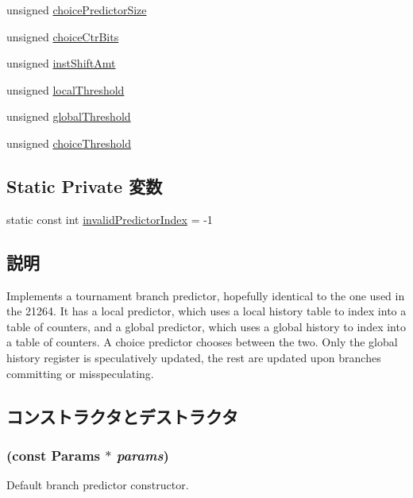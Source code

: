 \begin{DoxyCompactItemize}
\item 
unsigned \hyperlink{classTournamentBP_aa71f36048f2ff08f22872c928bb15ad7}{choicePredictorSize}
\item 
unsigned \hyperlink{classTournamentBP_aee44accc1717e338f8b33ff113d62be2}{choiceCtrBits}
\item 
unsigned \hyperlink{classTournamentBP_a8ad2ee60a6143561753205840ad144e7}{instShiftAmt}
\item 
unsigned \hyperlink{classTournamentBP_ad1e9eb27631bc79b7aaf699c608ab9e9}{localThreshold}
\item 
unsigned \hyperlink{classTournamentBP_ab40a9a7c94a0d33e3b1782a60c208c56}{globalThreshold}
\item 
unsigned \hyperlink{classTournamentBP_a6de119a3b475137cbfab3f2a0604886b}{choiceThreshold}
\end{DoxyCompactItemize}
\subsection*{Static Private 変数}
\begin{DoxyCompactItemize}
\item 
static const int \hyperlink{classTournamentBP_ac963a89cba9b2e4b21e99863bc5a78f1}{invalidPredictorIndex} = -\/1
\end{DoxyCompactItemize}


\subsection{説明}
Implements a tournament branch predictor, hopefully identical to the one used in the 21264. It has a local predictor, which uses a local history table to index into a table of counters, and a global predictor, which uses a global history to index into a table of counters. A choice predictor chooses between the two. Only the global history register is speculatively updated, the rest are updated upon branches committing or misspeculating. 

\subsection{コンストラクタとデストラクタ}
\hypertarget{classTournamentBP_ad2381a9dbad94a16f6413cf1d69b1ce1}{
\subsubsection[{TournamentBP}]{ (const {\bf Params} $\ast$ {\em params})}}
\label{classTournamentBP_ad2381a9dbad94a16f6413cf1d69b1ce1}
Default branch predictor constructor. 


